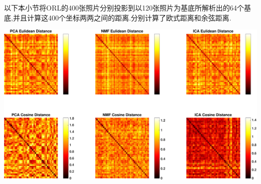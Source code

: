 以下本小节将ORL的400张照片分别投影到以120张照片为基底所解析出的64个基底,并且计算这400个坐标两两之间的距离.分别计算了欧式距离和余弦距离.

\begin{center}
\begin{minipage}[t]{\linewidth}
\center
{
\includegraphics[width=1.1\textwidth]{Img/pni_dist} 
}
\end{minipage}
\medskip
\end{center}

